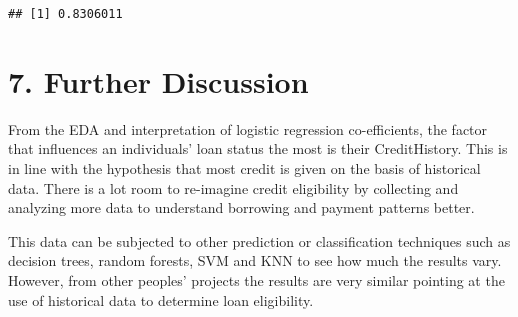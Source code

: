\documentclass[
]{article}
\begin{document}
\begin{verbatim}
## [1] 0.8306011
\end{verbatim}

\hypertarget{further-discussion}{%
\section{7. Further Discussion}\label{further-discussion}}

From the EDA and interpretation of logistic regression co-efficients,
the factor that influences an individuals' loan status the most is their
CreditHistory. This is in line with the hypothesis that most credit is
given on the basis of historical data. There is a lot room to re-imagine
credit eligibility by collecting and analyzing more data to understand
borrowing and payment patterns better.

This data can be subjected to other prediction or classification
techniques such as decision trees, random forests, SVM and KNN to see
how much the results vary. However, from other peoples' projects the
results are very similar pointing at the use of historical data to
determine loan eligibility.
\end{document}
